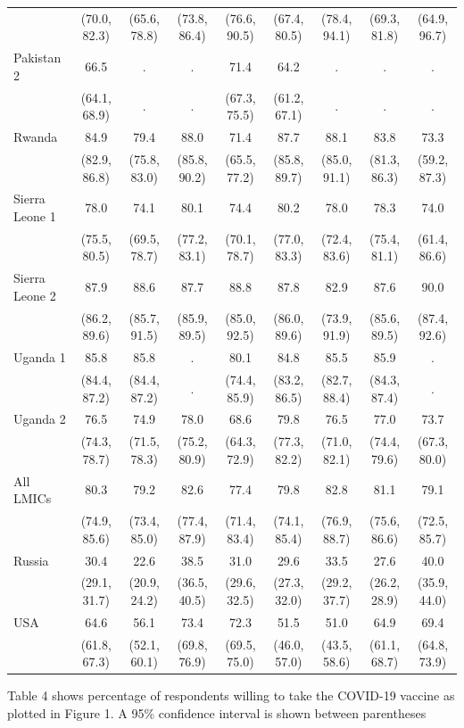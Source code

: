 \documentclass[
  12pt,
]{article}
\begin{document}
\begin{table}[!h]
{\begin{threeparttable}
\begin{tabular}[t]{lcccccccc}
 & (70.0, 82.3) & (65.6, 78.8) & (73.8, 86.4) & (76.6, 90.5) & (67.4, 80.5) & (78.4, 94.1) & (69.3, 81.8) & (64.9, 96.7)\\
Pakistan 2 & 66.5 & . & . & 71.4 & 64.2 & . & . & .\\
 & (64.1, 68.9) & . & . & (67.3, 75.5) & (61.2, 67.1) & . & . & .\\
Rwanda & 84.9 & 79.4 & 88.0 & 71.4 & 87.7 & 88.1 & 83.8 & 73.3\\
 & (82.9, 86.8) & (75.8, 83.0) & (85.8, 90.2) & (65.5, 77.2) & (85.8, 89.7) & (85.0, 91.1) & (81.3, 86.3) & (59.2, 87.3)\\
Sierra Leone 1 & 78.0 & 74.1 & 80.1 & 74.4 & 80.2 & 78.0 & 78.3 & 74.0\\
 & (75.5, 80.5) & (69.5, 78.7) & (77.2, 83.1) & (70.1, 78.7) & (77.0, 83.3) & (72.4, 83.6) & (75.4, 81.1) & (61.4, 86.6)\\
Sierra Leone 2 & 87.9 & 88.6 & 87.7 & 88.8 & 87.8 & 82.9 & 87.6 & 90.0\\
 & (86.2, 89.6) & (85.7, 91.5) & (85.9, 89.5) & (85.0, 92.5) & (86.0, 89.6) & (73.9, 91.9) & (85.6, 89.5) & (87.4, 92.6)\\
Uganda 1 & 85.8 & 85.8 & . & 80.1 & 84.8 & 85.5 & 85.9 & .\\
 & (84.4, 87.2) & (84.4, 87.2) & . & (74.4, 85.9) & (83.2, 86.5) & (82.7, 88.4) & (84.3, 87.4) & .\\
Uganda 2 & 76.5 & 74.9 & 78.0 & 68.6 & 79.8 & 76.5 & 77.0 & 73.7\\
 & (74.3, 78.7) & (71.5, 78.3) & (75.2, 80.9) & (64.3, 72.9) & (77.3, 82.2) & (71.0, 82.1) & (74.4, 79.6) & (67.3, 80.0)\\
All LMICs & 80.3 & 79.2 & 82.6 & 77.4 & 79.8 & 82.8 & 81.1 & 79.1\\
 & (74.9, 85.6) & (73.4, 85.0) & (77.4, 87.9) & (71.4, 83.4) & (74.1, 85.4) & (76.9, 88.7) & (75.6, 86.6) & (72.5, 85.7)\\
Russia & 30.4 & 22.6 & 38.5 & 31.0 & 29.6 & 33.5 & 27.6 & 40.0\\
 & (29.1, 31.7) & (20.9, 24.2) & (36.5, 40.5) & (29.6, 32.5) & (27.3, 32.0) & (29.2, 37.7) & (26.2, 28.9) & (35.9, 44.0)\\
USA & 64.6 & 56.1 & 73.4 & 72.3 & 51.5 & 51.0 & 64.9 & 69.4\\
 & (61.8, 67.3) & (52.1, 60.1) & (69.8, 76.9) & (69.5, 75.0) & (46.0, 57.0) & (43.5, 58.6) & (61.1, 68.7) & (64.8, 73.9)\\
\bottomrule
\end{tabular}
\begin{tablenotes}
\item Table 4 shows percentage of respondents willing to take the COVID-19 vaccine as plotted in Figure 1. A 95\% confidence interval is shown between parentheses
\end{tablenotes}
\end{threeparttable}}
\end{table}
\end{document}
